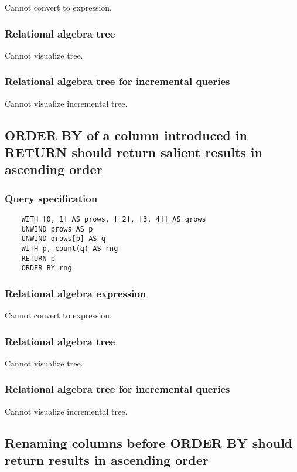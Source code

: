 	Cannot convert to expression.

	\subsubsection*{Relational algebra tree}

	Cannot visualize tree.

	\subsubsection*{Relational algebra tree for incremental queries}

	Cannot visualize incremental tree.
	\subsection{ORDER BY of a column introduced in RETURN should return salient results in ascending order}

	\subsubsection*{Query specification}

	\begin{lstlisting}
	WITH [0, 1] AS prows, [[2], [3, 4]] AS qrows
	UNWIND prows AS p
	UNWIND qrows[p] AS q
	WITH p, count(q) AS rng
	RETURN p
	ORDER BY rng
	\end{lstlisting}


	\subsubsection*{Relational algebra expression}

	Cannot convert to expression.

	\subsubsection*{Relational algebra tree}

	Cannot visualize tree.

	\subsubsection*{Relational algebra tree for incremental queries}

	Cannot visualize incremental tree.
	\subsection{Renaming columns before ORDER BY should return results in ascending order}

